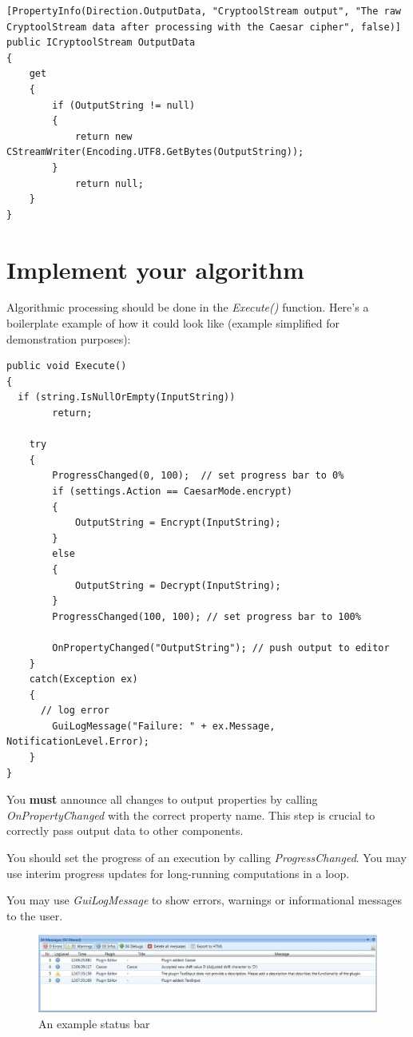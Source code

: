 \begin{lstlisting}
[PropertyInfo(Direction.OutputData, "CryptoolStream output", "The raw CryptoolStream data after processing with the Caesar cipher", false)]
public ICryptoolStream OutputData
{
	get
	{
		if (OutputString != null)
		{
			return new CStreamWriter(Encoding.UTF8.GetBytes(OutputString));
		}
			return null;
	}
}
\end{lstlisting}

\section{Implement your algorithm}
\label{sec:ImplementingTheActualAlgorithm}

Algorithmic processing should be done in the \textit{Execute()} function. Here's a boilerplate example of how it could look like (example simplified for demonstration purposes):

\begin{lstlisting}
public void Execute()
{
  if (string.IsNullOrEmpty(InputString))
		return;
	
	try
	{
		ProgressChanged(0, 100);  // set progress bar to 0%
		if (settings.Action == CaesarMode.encrypt)
		{
			OutputString = Encrypt(InputString);
		}
		else
		{
			OutputString = Decrypt(InputString);
		}
		ProgressChanged(100, 100); // set progress bar to 100%
		
		OnPropertyChanged("OutputString"); // push output to editor
	}
	catch(Exception ex)
	{
	  // log error
		GuiLogMessage("Failure: " + ex.Message, NotificationLevel.Error);
	}
}
\end{lstlisting}

You \textbf{must} announce all changes to output properties by calling \textit{OnPropertyChanged} with the correct property name. This step is crucial to correctly pass output data to other components.

You should set the progress of an execution by calling \textit{ProgressChanged}. You may use interim progress updates for long-running computations in a loop.

You may use \textit{GuiLogMessage} to show errors, warnings or informational messages to the user.

\begin{figure}[h]
	\centering
		\includegraphics[width=1.00\textwidth]{figures/status_bar.jpg}
	\caption{An example status bar}
	\label{fig:status_bar}
\end{figure}

